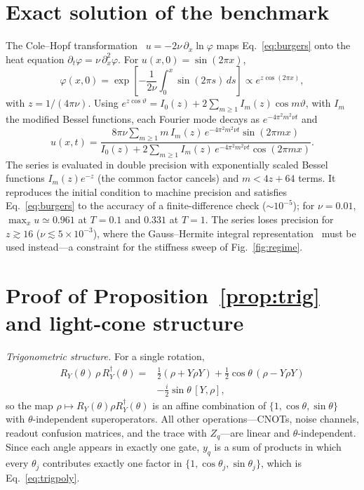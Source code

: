 \documentclass[floatfix,aps,pra,twocolumn,showpacs,superscriptaddress,10pt,nofootinbib]{revtex4-2}
\begin{document}
\newpage
\begin{appendices}

\section{Exact solution of the benchmark}\label{app:colehopf}
The Cole--Hopf transformation~\cite{cole1951quasi,hopf1950partial} $u=-2\nu\,\partial_x\ln\varphi$ maps Eq.~\eqref{eq:burgers} onto the heat equation $\partial_t\varphi=\nu\,\partial_x^2\varphi$. For $u(x,0)=\sin(2\pi x)$,
\begin{equation}
  \varphi(x,0)=\exp\!\left[-\frac{1}{2\nu}\int_0^x\sin(2\pi s)\,ds\right]\propto e^{z\cos(2\pi x)},
\end{equation}
with $z=1/(4\pi\nu)$. Using $e^{z\cos\vartheta}=I_0(z)+2\sum_{m\ge1}I_m(z)\cos m\vartheta$, with $I_m$ the modified Bessel functions, each Fourier mode decays as $e^{-4\pi^2m^2\nu t}$ and
\begin{equation}
  u(x,t)=\frac{8\pi\nu\sum_{m\ge1}m\,I_m(z)\,e^{-4\pi^2m^2\nu t}\sin(2\pi m x)}{I_0(z)+2\sum_{m\ge1}I_m(z)\,e^{-4\pi^2m^2\nu t}\cos(2\pi m x)}.
  \label{eq:colehopf}
\end{equation}
The series is evaluated in double precision with exponentially scaled Bessel functions $I_m(z)e^{-z}$ (the common factor cancels) and $m<4z+64$ terms. It reproduces the initial condition to machine precision and satisfies Eq.~\eqref{eq:burgers} to the accuracy of a finite-difference check ($\sim10^{-5}$); for $\nu=0.01$, $\max_x u\simeq0.961$ at $T=0.1$ and $0.331$ at $T=1$. The series loses precision for $z\gtrsim16$ ($\nu\lesssim5\times10^{-3}$), where the Gauss--Hermite integral representation~\cite{basdevant1986spectral} must be used instead---a constraint for the stiffness sweep of Fig.~\ref{fig:regime}.

\section{Proof of Proposition~\ref{prop:trig} and light-cone structure}\label{app:trig}
\emph{Trigonometric structure.} For a single rotation,
\begin{align}
  R_Y(\theta)\,\rho\,R_Y^\dagger(\theta)={}&\tfrac12(\rho+Y\rho Y)+\tfrac12\cos\theta\,(\rho-Y\rho Y)\nonumber\\
  &-\tfrac{i}{2}\sin\theta\,[Y,\rho],
  \label{eq:ry_channel}
\end{align}
so the map $\rho\mapsto R_Y(\theta)\rho R_Y^\dagger(\theta)$ is an affine combination of $\{1,\cos\theta,\sin\theta\}$ with $\theta$-independent superoperators. All other operations---CNOTs, noise channels, readout confusion matrices, and the trace with $Z_q$---are linear and $\theta$-independent. Since each angle appears in exactly one gate, $y_q$ is a sum of products in which every $\theta_j$ contributes exactly one factor in $\{1,\cos\theta_j,\sin\theta_j\}$, which is Eq.~\eqref{eq:trigpoly}.


\end{appendices}
\end{document}
